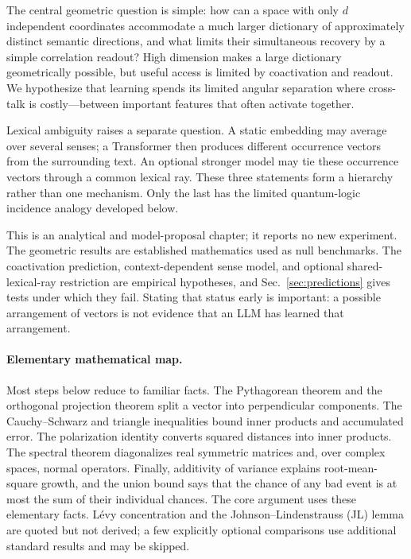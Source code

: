 \documentclass[
  aps,
  reprint,
  superscriptaddress,
  floatfix,
  nofootinbib,
  longbibliography
]{revtex4-2}
\begin{document}
The central geometric question is simple: how can a space with only $d$
independent coordinates accommodate a much larger dictionary of approximately
distinct semantic directions, and what limits their simultaneous recovery by
a simple correlation readout?  High dimension makes a large dictionary
geometrically possible, but useful access is limited by coactivation and
readout.  We hypothesize that learning spends its limited angular separation
where cross-talk is costly---between important features that often activate
together.

Lexical ambiguity raises a separate question.  A static embedding may average
over several senses; a Transformer then produces different occurrence vectors
from the surrounding text.  An optional stronger model may tie these
occurrence vectors through a common lexical ray.  These three statements form
a hierarchy rather than one mechanism.  Only the last has the limited
quantum-logic incidence analogy developed below.

This is an analytical and model-proposal chapter; it reports no new experiment.
The geometric results are established mathematics used as null benchmarks.
The coactivation prediction, context-dependent sense model, and optional
shared-lexical-ray restriction are empirical hypotheses, and
Sec.~\ref{sec:predictions} gives tests under which they fail.
Stating that status early is important: a possible arrangement of vectors is
not evidence that an LLM has learned that arrangement.

\paragraph{Elementary mathematical map.}
Most steps below reduce to familiar facts.  The Pythagorean
theorem and the orthogonal projection theorem split a vector into perpendicular
components.  The Cauchy--Schwarz and triangle inequalities bound inner products
and accumulated error.  The polarization identity converts squared distances
into inner products.  The spectral theorem diagonalizes real symmetric
matrices and, over complex spaces, normal operators.  Finally, additivity of
variance explains root-mean-square growth,
and the union bound says that the chance of any bad event is at most the sum of
their individual chances.  The core argument uses these elementary facts.
L\'evy concentration and the Johnson--Lindenstrauss (JL) lemma are quoted but not derived;
a few explicitly optional comparisons use additional standard results and may
be skipped.
\end{document}
